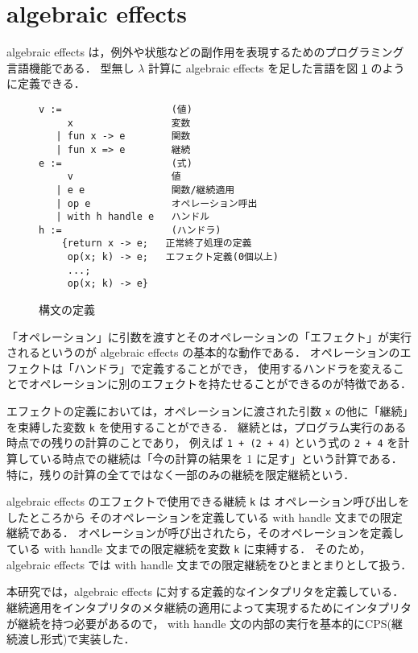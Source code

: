 \section{algebraic effects}
\label{section:algebraic effects}

algebraic effects は，例外や状態などの副作用を表現するためのプログラミング言語機能である．
型無し $\lambda$ 計算に algebraic effects を足した言語を図 \ref{figure:effects} のように定義できる．

\begin{figure}
\begin{verbatim}
v :=                   (値)
     x                 変数
   | fun x -> e        関数
   | fun x => e        継続
e :=                   (式)
     v                 値
   | e e               関数/継続適用
   | op e              オペレーション呼出
   | with h handle e   ハンドル
h :=                   (ハンドラ)
    {return x -> e;   正常終了処理の定義
     op(x; k) -> e;   エフェクト定義(0個以上)
     ...;
     op(x; k) -> e}
\end{verbatim}
\caption{構文の定義}
\label{figure:effects}
\end{figure}

「オペレーション」に引数を渡すとそのオペレーションの「エフェクト」が実行されるというのが algebraic effects の基本的な動作である．
オペレーションのエフェクトは「ハンドラ」で定義することができ，
使用するハンドラを変えることでオペレーションに別のエフェクトを持たせることができるのが特徴である．

エフェクトの定義においては，オペレーションに渡された引数 \texttt{x} の他に「継続」を束縛した変数 \texttt{k} を使用することができる．
継続とは，プログラム実行のある時点での残りの計算のことであり，
例えば \texttt{1 + (2 + 4)} という式の \texttt{2 + 4}
を計算している時点での継続は「今の計算の結果を 1 に足す」という計算である．
特に，残りの計算の全てではなく一部のみの継続を限定継続という．

algebraic effects のエフェクトで使用できる継続 \texttt{k} は
オペレーション呼び出しをしたところから
そのオペレーションを定義している with handle 文までの限定継続である．
オペレーションが呼び出されたら，そのオペレーションを定義している with handle 文までの限定継続を変数 \texttt{k} に束縛する．
そのため，algebraic effects では with handle 文までの限定継続をひとまとまりとして扱う．

本研究では，algebraic effects に対する定義的なインタプリタを定義している．
継続適用をインタプリタのメタ継続の適用によって実現するためにインタプリタが継続を持つ必要があるので，
with handle 文の内部の実行を基本的にCPS(継続渡し形式)で実装した．
